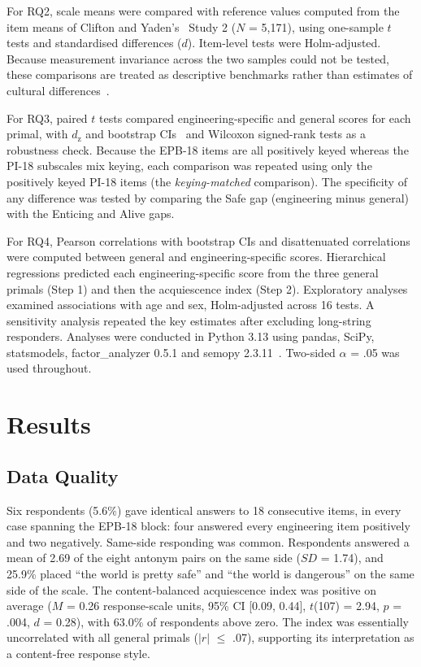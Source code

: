\documentclass[journal,a4paper]{IEEEtran}
\begin{document}
For RQ2, scale means were compared with reference values computed from the item means of Clifton and Yaden's~\cite{cliftonyaden2021} Study 2 ($N$ = 5,171), using one-sample $t$ tests and standardised differences ($d$). Item-level tests were Holm-adjusted. Because measurement invariance across the two samples could not be tested, these comparisons are treated as descriptive benchmarks rather than estimates of cultural differences~\cite{milfont2010}.

For RQ3, paired $t$ tests compared engineering-specific and general scores for each primal, with $d_{\mathrm{z}}$ and bootstrap CIs~\cite{lakens2013} and Wilcoxon signed-rank tests as a robustness check. Because the EPB-18 items are all positively keyed whereas the PI-18 subscales mix keying, each comparison was repeated using only the positively keyed PI-18 items (the \emph{keying-matched} comparison). The specificity of any difference was tested by comparing the Safe gap (engineering minus general) with the Enticing and Alive gaps.

For RQ4, Pearson correlations with bootstrap CIs and disattenuated correlations were computed between general and engineering-specific scores. Hierarchical regressions predicted each engineering-specific score from the three general primals (Step 1) and then the acquiescence index (Step 2). Exploratory analyses examined associations with age and sex, Holm-adjusted across 16 tests. A sensitivity analysis repeated the key estimates after excluding long-string responders. Analyses were conducted in Python 3.13 using pandas, SciPy, statsmodels, factor\_analyzer 0.5.1 and semopy 2.3.11~\cite{igolkina2020}. Two-sided $\alpha$ = .05 was used throughout.

\section{Results}

\subsection{Data Quality}

Six respondents (5.6\%) gave identical answers to 18 consecutive items, in every case spanning the EPB-18 block: four answered every engineering item positively and two negatively. Same-side responding was common. Respondents answered a mean of 2.69 of the eight antonym pairs on the same side ($SD$ = 1.74), and 25.9\% placed ``the world is pretty safe'' and ``the world is dangerous'' on the same side of the scale. The content-balanced acquiescence index was positive on average ($M$ = 0.26 response-scale units, 95\% CI [0.09, 0.44], $t$(107) = 2.94, $p$ = .004, $d$ = 0.28), with 63.0\% of respondents above zero. The index was essentially uncorrelated with all general primals ($| r |$ $\le$ .07), supporting its interpretation as a content-free response style.
\end{document}
